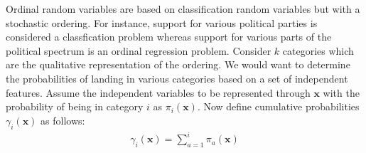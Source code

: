 \documentclass[a4paper, 11pt]{article}
\begin{document}



Ordinal random variables are based on classification random variables but with a stochastic ordering. For instance, support for various political parties is considered a classfication problem whereas support for various parts of the political spectrum is an ordinal regression problem.
Consider $k$ categories which are the qualitative representation of the ordering. We would want to determine the probabilities of landing in various categories based on a set of independent features.
\newline
Assume the independent variables to be represented through $\textbf{x}$ with the probability of being in category $i$ as $\pi_i(\textbf{x})$. Now define cumulative probabilities $\gamma_i(\textbf{x})$ as follows: \newline
\begin{align}
    \gamma_i(\textbf{x}) = \sum_{a=1}^{i} \pi_a(\textbf{x})
\end{align}
\end{document}
